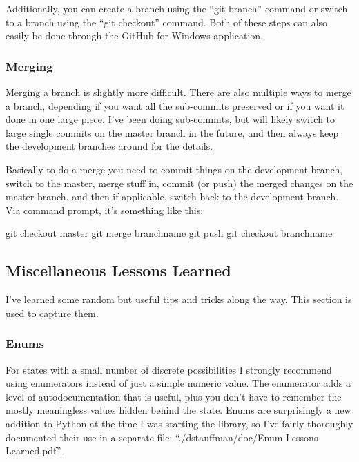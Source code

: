 \documentclass[12pt]{article}
\begin{document}
Additionally, you can create a branch using the ``git branch'' command or switch to a branch using the ``git checkout'' command.  Both of these steps can also easily be done through the GitHub for Windows application.

\subsubsection{Merging}
Merging a branch is slightly more difficult.  There are also multiple ways to merge a branch, depending if you want all the sub-commits preserved or if you want it done in one large piece.  I've been doing sub-commits, but will likely switch to large single commits on the master branch in the future, and then always keep the development branches around for the details.

Basically to do a merge you need to commit things on the development branch, switch to the master, merge stuff in, commit (or push) the merged changes on the master branch, and then if applicable, switch back to the development branch.  Via command prompt, it's something like this:
\begin{PlainText}
git checkout master
git merge branchname
git push
git checkout branchname
\end{PlainText}

\subsection{Miscellaneous Lessons Learned}\label{h2:misc_lessons}
I've learned some random but useful tips and tricks along the way.  This section is used to capture them.

\subsubsection{Enums}
For states with a small number of discrete possibilities I strongly recommend using enumerators instead of just a simple numeric value.  The enumerator adds a level of autodocumentation that is useful, plus you don't have to remember the mostly meaningless values hidden behind the state.  Enums are surprisingly a new addition to Python at the time I was starting the library, so I've fairly thoroughly documented their use in a separate file: ``./dstauffman/doc/Enum Lessons Learned.pdf''.
\end{document}
